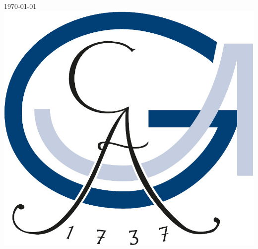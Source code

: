 \begin{titlepage}

{\large \today}\\[2cm] %


\includegraphics{logo_1.jpg}\\[1cm] %


\vfill %

\end{titlepage}



